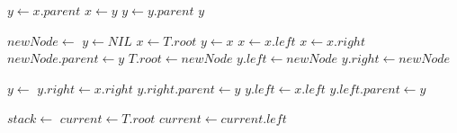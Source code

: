 \begin{algorithmic}
        \State \Return {}
    \EndIf
    \State $y \gets x.parent$
        \State $x \gets y$
        \State $y \gets y.parent$
    \EndWhile
    \State \Return $y$
\EndFunction
\end{algorithmic}

\begin{algorithmic}
    \State $newNode \gets$ 
    \State $y \gets NIL$
    \State $x \gets T.root$
        \State $y \gets x$
            \State $x \gets x.left$
        \Else
            \State $x \gets x.right$
        \EndIf
    \EndWhile
    \State $newNode.parent \gets y$
        \State $T.root \gets newNode$
        \State $y.left \gets newNode$
    \Else
        \State $y.right \gets newNode$
    \EndIf
\EndFunction
\end{algorithmic}

\begin{algorithmic}
        \State {}
        \State {}
    \Else
        \State $y \gets$ 
            \State {}
            \State $y.right \gets x.right$
            \State $y.right.parent \gets y$
        \EndIf
        \State {}
        \State $y.left \gets x.left$
        \State $y.left.parent \gets y$
    \EndIf
\EndFunction
\end{algorithmic}
\begin{algorithmic}
    \State $stack \gets$ 
    \State $current \gets T.root$
            \State {}
            \State $current \gets current.left$
        \End
\EndFunction
\end{algorithmic}


%
%
%
%




